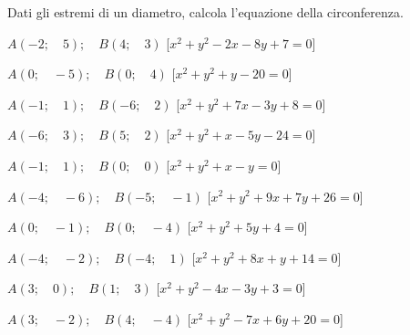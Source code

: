 \begin{esercizio}\label{ese:}
 Dati gli estremi di un diametro, calcola l'equazione della circonferenza.
 \begin{enumeratea}
  \item  \(A \left (-2; \quad 5 \right ); \quad B \left (4; \quad 3 \right )\)
   \hfill [\(x^2 + y^2 -2x -8y +7 = 0\)]
  \item  \(A \left (0; \quad -5 \right ); \quad B \left (0; \quad 4 \right )\)
   \hfill [\(x^2 + y^2 +y -20 = 0\)]
  \item  \(A \left (-1; \quad 1 \right ); \quad B \left (-6; \quad 2 \right )\)
   \hfill [\(x^2 + y^2 +7x -3y +8 = 0\)]
  \item  \(A \left (-6; \quad 3 \right ); \quad B \left (5; \quad 2 \right )\)
   \hfill [\(x^2 + y^2 +x -5y -24 = 0\)]
  \item  \(A \left (-1; \quad 1 \right ); \quad B \left (0; \quad 0 \right )\)
   \hfill [\(x^2 + y^2 +x -y  = 0\)]
  \item  \(A \left (-4; \quad -6 \right ); \quad B \left (-5; \quad -1 \right 
)\)
   \hfill [\(x^2 + y^2 +9x +7y +26 = 0\)]
  \item  \(A \left (0; \quad -1 \right ); \quad B \left (0; \quad -4 \right )\)
   \hfill [\(x^2 + y^2 +5y +4 = 0\)]
  \item  \(A \left (-4; \quad -2 \right ); \quad B \left (-4; \quad 1 \right )\)
   \hfill [\(x^2 + y^2 +8x +y +14 = 0\)]
  \item  \(A \left (3; \quad 0 \right ); \quad B \left (1; \quad 3 \right )\)
   \hfill [\(x^2 + y^2 -4x -3y +3 = 0\)]
  \item  \(A \left (3; \quad -2 \right ); \quad B \left (4; \quad -4 \right )\)
   \hfill [\(x^2 + y^2 -7x +6y +20 = 0\)]
 \end{enumeratea}
\end{esercizio}


